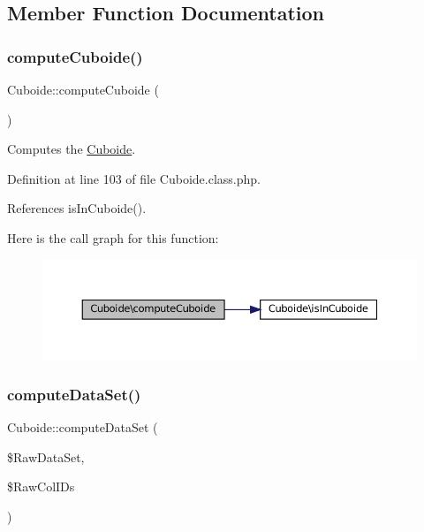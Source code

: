 \subsection{Member Function Documentation}
\mbox{\label{class_cuboide_a53d2c94aad8c0cde1a7e3492bd94914d}} 
\subsubsection{\texorpdfstring{compute\+Cuboide()}{computeCuboide()}}
{\footnotesize\ttfamily Cuboide\+::compute\+Cuboide (\begin{DoxyParamCaption}{ }\end{DoxyParamCaption})}

Computes the \hyperlink{class_cuboide}{Cuboide}. 

Definition at line 103 of file Cuboide.\+class.\+php.



References is\+In\+Cuboide().

Here is the call graph for this function\+:\nopagebreak
\begin{figure}[H]
\begin{center}
\leavevmode
\includegraphics[width=350pt]{class_cuboide_a53d2c94aad8c0cde1a7e3492bd94914d_cgraph}
\end{center}
\end{figure}
\mbox{\label{class_cuboide_aec2eedda1f5b778028d663e925b19d02}} 
\subsubsection{\texorpdfstring{compute\+Data\+Set()}{computeDataSet()}}
{\footnotesize\ttfamily Cuboide\+::compute\+Data\+Set (\begin{DoxyParamCaption}\item[{}]{\$\+Raw\+Data\+Set,  }\item[{}]{\$\+Raw\+Col\+I\+Ds }\end{DoxyParamCaption})\hspace{0.3cm}{\ttfamily [protected]}}

